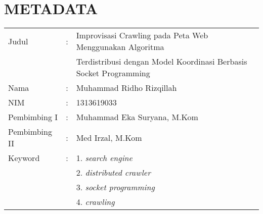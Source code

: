 \pagestyle{empty}
\chapter*{\centering \large METADATA}
\thispagestyle{empty}
\onehalfspacing{}

\vspace{2cm}
\noindent
\begin{tabular}{lcl}
	Judul	& :&  Improvisasi Crawling pada Peta Web Menggunakan Algoritma \\
	& & Terdistribusi dengan Model Koordinasi Berbasis Socket Programming\\
	Nama	& :&  Muhammad Ridho Rizqillah \\
	NIM	& :&  1313619033 \\
	Pembimbing I	& :&  Muhammad Eka Suryana, M.Kom \\
	Pembimbing II	& :&  Med Irzal, M.Kom \\
	Keyword	& :& 1. \emph{search engine} \\
	& & 2. \emph{distributed crawler} \\
	& & 3. \emph{socket programming} \\
	& & 4. \emph{crawling}
\end{tabular}
\vspace{0.5cm}